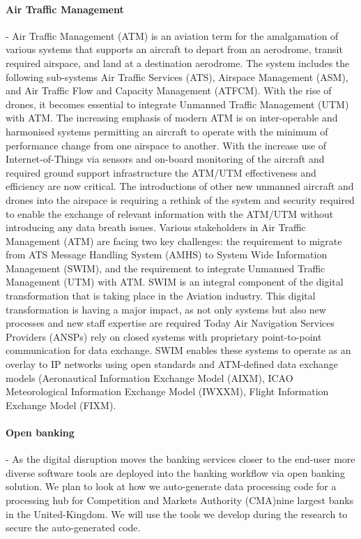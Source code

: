 \documentclass[a4paper,11pt]{article}
\begin{document}
\paragraph{Air Traffic Management}
\label{sec:atm}
- Air Traffic Management (ATM) is an aviation term for the amalgamation of various systems that supports an aircraft to depart from an aerodrome, transit required airspace, and land at a destination aerodrome. The system includes the following sub-systems Air Traffic Services (ATS), Airspace Management (ASM), and Air Traffic Flow and Capacity Management (ATFCM). With the rise of drones, it becomes essential to integrate Unmanned Traffic Management (UTM) with ATM. The increasing emphasis of modern ATM is on inter-operable and harmonised systems permitting an aircraft to operate with the minimum of performance change from one airspace to another. With the increase use of Internet-of-Things via sensors and on-board monitoring of the aircraft and required ground support infrastructure the ATM/UTM effectiveness and efficiency are now critical. The introductions of other new unmanned aircraft and drones into the airspace is requiring a rethink of the system and security required to enable the exchange of relevant information with the ATM/UTM without introducing any data breath issues. 
Various stakeholders in Air Traffic Management (ATM) are facing two key challenges: the requirement to migrate from ATS Message Handling System (AMHS) to System Wide Information Management (SWIM), and the requirement to integrate Unmanned Traffic Management (UTM) with ATM. SWIM is an integral component of the digital transformation that is taking place in the Aviation industry. This digital transformation is having a major impact, as not only systems but also new processes and new staff expertise are required Today Air Navigation Services Providers (ANSPs) rely on closed systems with proprietary point-to-point communication for data exchange. SWIM enables these systems to operate as an overlay to IP networks using open standards and ATM-defined data exchange models (Aeronautical Information Exchange Model (AIXM), ICAO Meteorological Information Exchange Model (IWXXM), Flight Information Exchange Model (FIXM). 

\paragraph{Open banking}
\label{sec:banking}
- As the digital disruption moves the banking services closer to the end-user more diverse software tools are deployed into the banking workflow via open banking solution. We plan to look at how we auto-generate data processing code for a processing hub for Competition and Markets Authority (CMA)nine largest banks in the United-Kingdom. We will use the tools we develop during the research to secure the auto-generated code.
\end{document}
